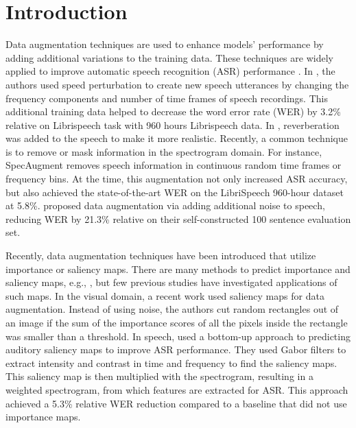 \documentclass{article}
\begin{document}
\section{Introduction}
Data augmentation techniques are used to enhance models' performance by adding additional variations to the training data. These techniques are widely applied to improve automatic speech recognition (ASR) performance \cite{ko15_interspeech,kim17_interspeech,Hannun2014DeepSS,nguyen2020improving}. In \cite{ko15_interspeech}, the authors used speed perturbation to create new speech utterances by changing the frequency components and number of time frames of speech recordings. This additional training data helped to decrease the word error rate (WER) by 3.2\% relative on Librispeech task with 960 hours Librispeech data. In \cite{kim17_interspeech}, reverberation was added to the speech to make it more realistic. Recently, a common technique is to remove or mask information in the spectrogram domain. For instance, SpecAugment \cite{park2019specaugment} removes speech information in  continuous random time frames or  frequency bins. At the time, this augmentation not only increased ASR accuracy, but also achieved the state-of-the-art WER on the LibriSpeech 960-hour dataset at 5.8\%. \cite{Hannun2014DeepSS} proposed data augmentation via adding additional noise to speech, reducing WER by 21.3\% relative on their self-constructed 100 sentence evaluation set. 


Recently, data augmentation techniques have been introduced that utilize importance or saliency maps. There are many methods to predict importance and saliency maps, e.g., \cite{itti1998model,Harel2006,jetley2016end,Kummerer_2017_ICCV,hou2007saliency,pan2017salgan,kim2017bubbleview,spille2017listening,Trinh2020,trinh2018bubble,9271908}, but few previous studies have investigated applications of such maps. In the visual domain, a recent work \cite{gong2021keepaugment} used saliency maps for data augmentation. Instead of using noise, the authors cut random rectangles out of an image if the sum of the importance scores of all the pixels inside the rectangle was smaller than a threshold. In speech, \cite{do2018weighting} used a bottom-up approach to predicting auditory saliency maps to improve ASR performance. They used Gabor filters to extract intensity and contrast in time and frequency to find the saliency maps. This saliency map is then multiplied with the spectrogram, resulting in a weighted spectrogram, from which features are extracted for ASR. This approach achieved a 5.3\% relative WER reduction compared to a baseline that did not use importance maps. 
\end{document}
